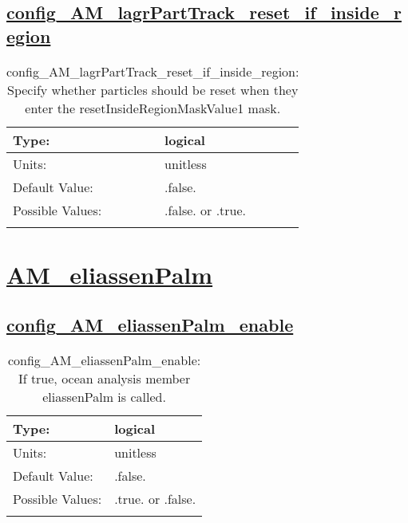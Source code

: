 \subsection[config\_AM\_lagrPartTrack\_reset\_if\_inside\_region]{\hyperref[sec:nm_tab_AM_lagrPartTrack]{config\_AM\_lagrPartTrack\_reset\_if\_inside\_region}}
\label{subsec:nm_sec_config_AM_lagrPartTrack_reset_if_inside_region}
\begin{center}
\begin{longtable}{| p{2.0in} || p{4.0in} |}
    \hline
    Type: & logical \\
    \hline
    Units: & \si{unitless} \\
    \hline
    Default Value: & .false. \\
    \hline
    Possible Values: & .false. or .true. \\
    \hline
    \caption{config\_AM\_lagrPartTrack\_reset\_if\_inside\_region: Specify whether particles should be reset when they enter the resetInsideRegionMaskValue1 mask.}
\end{longtable}
\end{center}
\section[AM\_eliassenPalm]{\hyperref[sec:nm_tab_AM_eliassenPalm]{AM\_eliassenPalm}}
\label{sec:nm_sec_AM_eliassenPalm}
\subsection[config\_AM\_eliassenPalm\_enable]{\hyperref[sec:nm_tab_AM_eliassenPalm]{config\_AM\_eliassenPalm\_enable}}
\label{subsec:nm_sec_config_AM_eliassenPalm_enable}
\begin{center}
\begin{longtable}{| p{2.0in} || p{4.0in} |}
    \hline
    Type: & logical \\
    \hline
    Units: & \si{unitless} \\
    \hline
    Default Value: & .false. \\
    \hline
    Possible Values: & .true. or .false. \\
    \hline
    \caption{config\_AM\_eliassenPalm\_enable: If true, ocean analysis member eliassenPalm is called.}
\end{longtable}
\end{center}
